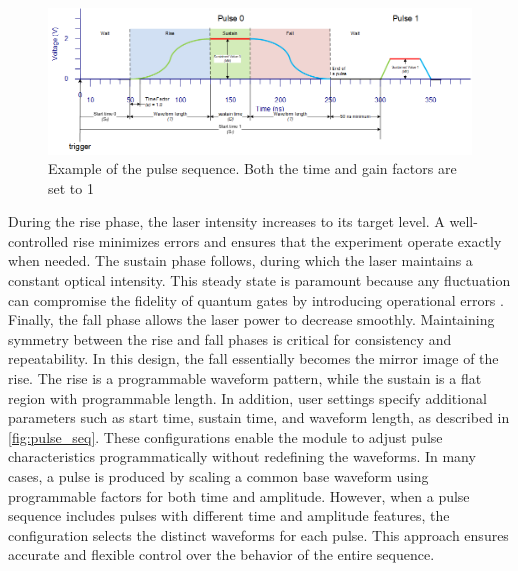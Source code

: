\begin{figure}[h]
    \setlength{\abovecaptionskip}{5pt}    %
    \setlength{\belowcaptionskip}{5pt}    %
    \centering
    \includegraphics[width=1\linewidth]{figures/2.1.png}
    \caption{Example of the pulse sequence. Both the time and gain factors are set to 1}
    \label{fig:pulse_seq}
\end{figure}

During the rise phase, the laser intensity increases to its target level. A well-controlled rise minimizes errors and ensures that the experiment operate exactly when needed. The sustain phase follows, during which the laser maintains a constant optical intensity. This steady state is paramount because any fluctuation can compromise the fidelity of quantum gates by introducing operational errors \cite{naturequantuminfo}. Finally, the fall phase allows the laser power to decrease smoothly. Maintaining symmetry between the rise and fall phases is critical for consistency and repeatability. In this design, the fall essentially becomes the mirror image of the rise. The rise is a programmable waveform pattern, while the sustain is a flat region with programmable length. 
In addition, user settings specify additional parameters such as start time, sustain time, and waveform length, as described in \autoref{fig:pulse_seq}. These configurations enable the module to adjust pulse characteristics programmatically without redefining the waveforms. In many cases, a pulse is produced by scaling a common base waveform using programmable factors for both time and amplitude. However, when a pulse sequence includes pulses with different time and amplitude features, the configuration selects the distinct waveforms for each pulse. This approach ensures accurate and flexible control over the behavior of the entire sequence. 

